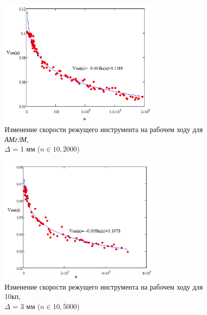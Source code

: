 \documentclass[11pt,twoside,openany]{report}
\begin{document}
\begin{figure}
  \begin{center}
  \includegraphics[width=0.7\textwidth]{amg3m.png}
  \caption{
    Изменение скорости режущего инструмента
    на рабочем ходу для
    {\it АМг3М},
    \\
    $\Delta$ = 1 мм
    ($n \in \overline{10,2000}$)
  }
  \label{amg3m}
  \end{center}
\end{figure}

\begin{figure}
  \begin{center}
  \includegraphics[width=0.7\textwidth]{10kp.png}
  \caption{
    Изменение скорости режущего инструмента
    на рабочем ходу для 10кп,
    \\
    $\Delta$ = 3 мм
    ($n \in \overline{10,5000}$)
  }
  \label{10kp}
  \end{center}
\end{figure}
\end{document}
